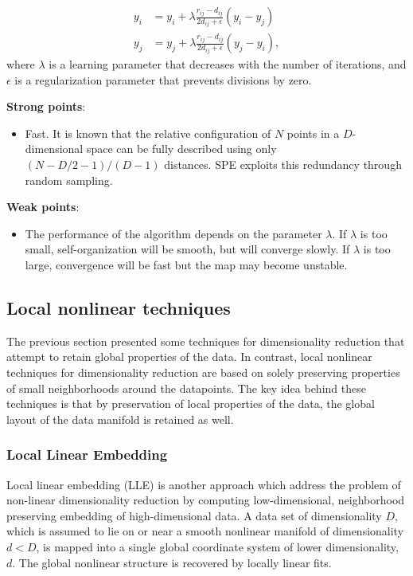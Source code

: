 \documentclass[a4paper]{article}
\begin{document}
\begin{align*}
  y_i &= y_i + \lambda \frac{r_{ij}-d_{ij}}{2d_{ij} + \epsilon}(y_i - y_j)\\
  y_j &= y_j + \lambda \frac{r_{ij}-d_{ij}}{2d_{ij} + \epsilon}(y_j - y_i),
\end{align*}
where $\lambda$ is a learning parameter that decreases with the number of iterations, and $\epsilon$ is a regularization parameter that
prevents divisions by zero.

\textbf{Strong points}:
\begin{itemize}
  \item Fast. It is known that the relative configuration of $N$ points in a
    $D$-dimensional space can be fully described using only $(N - D/2
    - 1)/(D - 1)$ distances. SPE exploits this redundancy through random sampling.
\end{itemize}

\textbf{Weak points}:
\begin{itemize}
  \item The performance of the algorithm depends on the parameter
    $\lambda$. If $\lambda$ is too small, self-organization will be
    smooth, but will converge slowly. If $\lambda$ is too large,
    convergence will be fast but the map may become unstable.
\end{itemize}

\subsection{Local nonlinear techniques}
The previous section presented some techniques for dimensionality reduction that attempt to retain global properties of
the data. In contrast, local nonlinear techniques for dimensionality reduction are based on solely preserving properties
of small neighborhoods around the datapoints. The key idea behind these techniques is that by preservation of local
properties of the data, the global layout of the data manifold is retained as well.

\subsubsection{Local Linear Embedding}

Local linear embedding (LLE) is another approach which address the problem of non-linear dimensionality reduction
by computing low-dimensional, neighborhood preserving embedding of
high-dimensional data. A data set of dimensionality $D$, which is
assumed to lie on or near a smooth nonlinear manifold of
dimensionality $d < D$, is mapped into a single global coordinate system of lower dimensionality, $d$. The global nonlinear structure is recovered by locally
linear fits.
\end{document}
